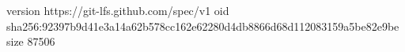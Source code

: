 version https://git-lfs.github.com/spec/v1
oid sha256:92397b9d41e3a14a62b578cc162e62280d4db8866d68d112083159a5be82e9be
size 87506
